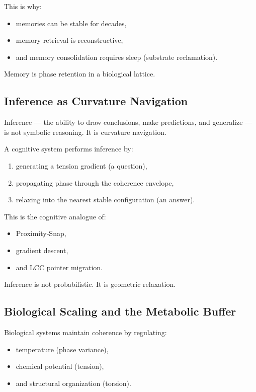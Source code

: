 \documentclass[reprint,amsmath,amssymb,aps,prl,floatfix]{revtex4-2}
\begin{document}
\begin{itemize}
This is why:
\begin{itemize}
\item memories can be stable for decades,  
\item memory retrieval is reconstructive,  
\item and memory consolidation requires sleep (substrate reclamation).
\end{itemize}
\medskip

Memory is phase retention in a biological lattice.

\subsection{Inference as Curvature Navigation}

Inference — the ability to draw conclusions, make predictions, and generalize — is not symbolic reasoning. It is curvature navigation.
\medskip

A cognitive system performs inference by:
\begin{enumerate}
\item generating a tension gradient (a question),  
\item propagating phase through the coherence envelope,  
\item relaxing into the nearest stable configuration (an answer).
\end{enumerate}
\medskip

This is the cognitive analogue of:
\begin{itemize}
\item Proximity‑Snap,  
\item gradient descent,  
\item and LCC pointer migration.
\end{itemize}
\medskip

Inference is not probabilistic.  
It is geometric relaxation.

\subsection{Biological Scaling and the Metabolic Buffer}

Biological systems maintain coherence by regulating:
\begin{itemize}
\item temperature (phase variance),  
\item chemical potential (tension),  
\item and structural organization (torsion).
\end{itemize}
\medskip


\end{itemize}
\end{document}
